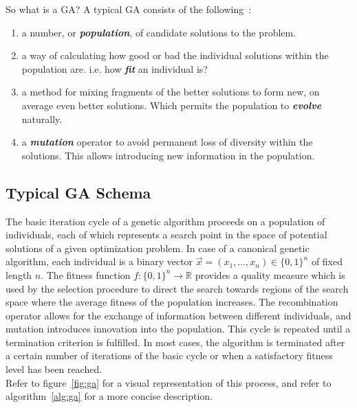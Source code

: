 \documentclass[12pt]{article}
\newcommand{\textem}[1]{\textbf{\emph{#1}}}
\begin{document}
\noindent
So what is a GA? A typical GA consists of the following~\cite[ch.~1]{coley}:
\vspace{-5mm}
\begin{enumerate}
\setlength{\parskip}{0em}

\item
a number, or \textem{population}, of candidate solutions to the problem.

\item
a way of calculating how good or bad the individual solutions within the
population are.
i.e. how \textem{fit} an individual is?

\item
a method for mixing fragments of the better solutions to form new, on
average even better solutions.
Which permits the population to \textem{evolve} naturally.

\item
a \textem{mutation} operator to avoid permanent loss of diversity within the
solutions.
This allows introducing new information in the population.

\end{enumerate}

\subsection{Typical GA Schema}
The basic iteration cycle of a genetic algorithm proceeds on a population
of individuals, each of which represents a search point in the space
of potential solutions of a given optimization problem.
In case of a canonical genetic algorithm, each individual is a binary vector
$ \vec{x} = ( x_1, \dots, x_n ) \in \{0, 1\}^n $
of fixed length $n$.
The fitness function
$ f: \{0, 1\}^n \rightarrow \mathbb{R} $
provides a quality measure which is used by the selection procedure to direct
the search towards regions of the search space where the
average fitness of the population increases.
The recombination operator
allows for the exchange of information between different individuals,
and mutation introduces innovation into the population.
This cycle is repeated until a termination criterion is fulfilled.
In most cases, the algorithm is terminated after a certain number of
iterations of the basic cycle or when a satisfactory fitness
level has been reached.\\
Refer to figure~\ref{fig:ga} for a visual representation of this process,
and refer to algorithm~\ref{alg:ga} for a more concise description.
\end{document}
